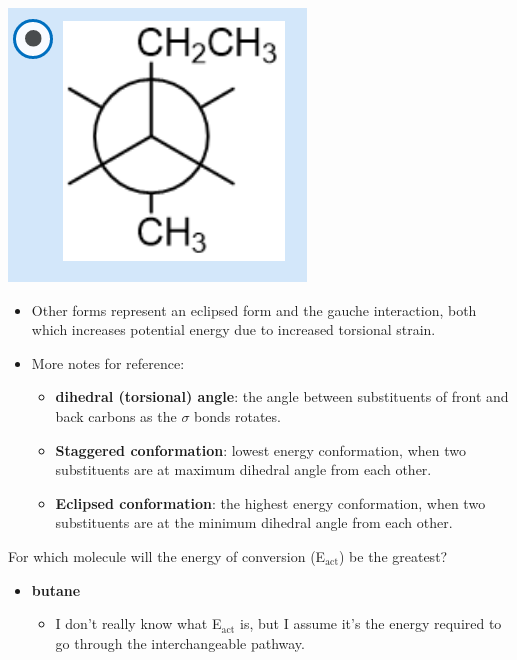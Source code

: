 \documentclass[12pt,a4paper]{article}
\begin{document}
\begin{enumerate}
\begin{itemize}
            \includegraphics[scale=0.3]{images/newman2.png}
            \begin{itemize}
                \item Other forms represent an eclipsed form and the gauche interaction, both which increases potential energy due to increased torsional strain.
                \item More notes for reference:
                    \begin{itemize}
                        \item \textbf{dihedral (torsional) angle}: the angle between substituents of front and back carbons as the $\sigma$ bonds rotates.
                        \item \textbf{Staggered conformation}: {\color{o-Sun}lowest energy} conformation, when two substituents are at maximum dihedral angle from each other.
                        \item \textbf{Eclipsed conformation}: the {\color{o-Sun}highest energy} conformation, when two substituents are at the minimum dihedral angle from each other.
                    \end{itemize}
            \end{itemize}
        \end{itemize}
    \newpage
    {\color{G-Moon}\item For which molecule will the energy of conversion (E\(_{\text{act}}\)) be the greatest?}
        \begin{itemize}
            \item {\color{o-Sun}\textbf{butane}}
            \begin{itemize}
                \item I don't really know what E\(_{\text{act}}\) is, but I assume it's the energy required to go through the interchangeable pathway.

\end{itemize}
\end{itemize}
\end{enumerate}
\end{document}
